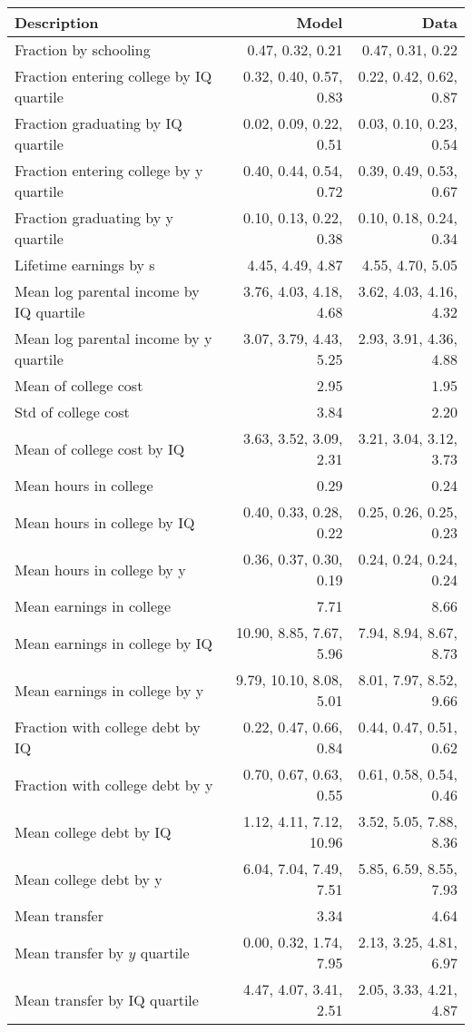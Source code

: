 \begin{tabular}{lrr}
\hline
Description & Model  & Data  \\
\hline
Fraction by schooling & 0.47, 0.32, 0.21  & 0.47, 0.31, 0.22  \\
Fraction entering college by IQ quartile & 0.32, 0.40, 0.57, 0.83  & 0.22, 0.42, 0.62, 0.87  \\
Fraction graduating by IQ quartile & 0.02, 0.09, 0.22, 0.51  & 0.03, 0.10, 0.23, 0.54  \\
Fraction entering college by y quartile & 0.40, 0.44, 0.54, 0.72  & 0.39, 0.49, 0.53, 0.67  \\
Fraction graduating by y quartile & 0.10, 0.13, 0.22, 0.38  & 0.10, 0.18, 0.24, 0.34  \\
Lifetime earnings by s & 4.45, 4.49, 4.87  & 4.55, 4.70, 5.05  \\
Mean log parental income by IQ quartile & 3.76, 4.03, 4.18, 4.68  & 3.62, 4.03, 4.16, 4.32  \\
Mean log parental income by y quartile & 3.07, 3.79, 4.43, 5.25  & 2.93, 3.91, 4.36, 4.88  \\
Mean of college cost & 2.95  & 1.95  \\
Std of college cost & 3.84  & 2.20  \\
Mean of college cost by IQ & 3.63, 3.52, 3.09, 2.31  & 3.21, 3.04, 3.12, 3.73  \\
Mean hours in college & 0.29  & 0.24  \\
Mean hours in college by IQ & 0.40, 0.33, 0.28, 0.22  & 0.25, 0.26, 0.25, 0.23  \\
Mean hours in college by y & 0.36, 0.37, 0.30, 0.19  & 0.24, 0.24, 0.24, 0.24  \\
Mean earnings in college & 7.71  & 8.66  \\
Mean earnings in college by IQ & 10.90, 8.85, 7.67, 5.96  & 7.94, 8.94, 8.67, 8.73  \\
Mean earnings in college by y & 9.79, 10.10, 8.08, 5.01  & 8.01, 7.97, 8.52, 9.66  \\
Fraction with college debt by IQ & 0.22, 0.47, 0.66, 0.84  & 0.44, 0.47, 0.51, 0.62  \\
Fraction with college debt by y & 0.70, 0.67, 0.63, 0.55  & 0.61, 0.58, 0.54, 0.46  \\
Mean college debt by IQ & 1.12, 4.11, 7.12, 10.96  & 3.52, 5.05, 7.88, 8.36  \\
Mean college debt by y & 6.04, 7.04, 7.49, 7.51  & 5.85, 6.59, 8.55, 7.93  \\
Mean transfer & 3.34  & 4.64  \\
Mean transfer by $y$ quartile & 0.00, 0.32, 1.74, 7.95  & 2.13, 3.25, 4.81, 6.97  \\
Mean transfer by IQ quartile & 4.47, 4.07, 3.41, 2.51  & 2.05, 3.33, 4.21, 4.87  \\
\hline
\end{tabular}%
